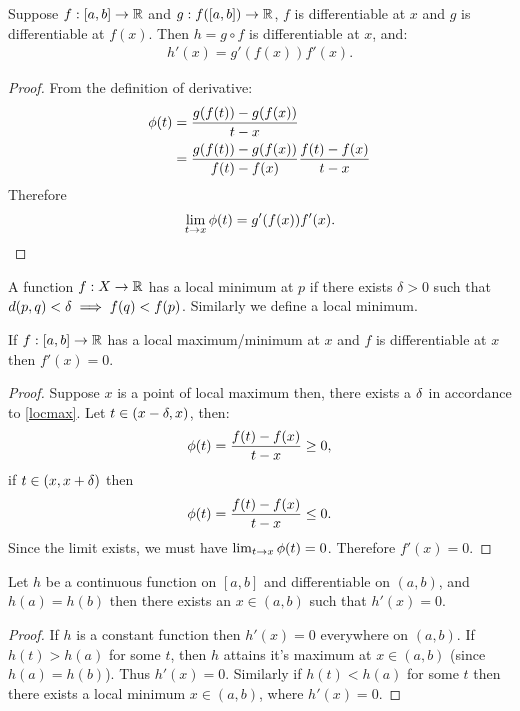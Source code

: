 \begin{proposition}
  Suppose $f:[a,b]\to \mathbb{R}$ and $g:f([a,b])\to \mathbb{R}$, $f$ is differentiable at $x$ and $g$ is differentiable at $f(x)$. Then $h = g\circ f$ is differentiable at $x$, and:
  \begin{align*}
    h'(x) = g'(f(x))f'(x).
  \end{align*}
\end{proposition}
\begin{proof}
  From the definition of derivative:
  \begin{align*}
    \phi(t) &= \frac{g(f(t)) - g(f(x))}{t-x}\\
          &= \frac{g(f(t)) - g(f(x))}{f(t)-f(x)}\frac{f(t)-f(x)}{t-x}\\
  \end{align*}
  Therefore
  \begin{align*}
    \lim_{t\to x} \phi(t) = g'(f(x)) f'(x).
  \end{align*}
\end{proof}
\begin{definition}\label{def:locmax}
  A function $f:X\to \mathbb{R}$ has a local minimum at $p$ if there exists $\delta > 0$ such that $d(p,q) <\delta \implies f(q) < f(p)$. Similarly we define a local minimum.
\end{definition}
\begin{proposition}
  If $f:[a,b] \to \mathbb{R}$ has a local maximum/minimum at $x$ and $f$ is differentiable at $x$ then $f'(x) = 0$.
\end{proposition}
\begin{proof}
  Suppose $x$ is a point of local maximum then, there exists a $\delta$ in accordance to \cref{locmax}. Let $t\in (x-\delta, x)$, then:
  \begin{align*}
    \phi(t) = \frac{f(t)-f(x)}{t-x} \geq 0,
  \end{align*}
  if $t\in (x, x+\delta)$ then
  \begin{align*}
    \phi(t) = \frac{f(t)-f(x)}{t-x} \leq 0.
  \end{align*}
  Since the limit exists, we must have $\lim_{t\to x}\phi(t) = 0$. Therefore $f'(x) = 0$.
\end{proof}
\begin{proposition}
  Let $h$ be a continuous function on $[a,b]$ and differentiable on $(a,b)$, and $h(a) = h(b)$ then there exists an $x\in (a,b)$ such that $h'(x) = 0$. 
\end{proposition}
\begin{proof}
  If $h$ is a constant function then $h'(x) = 0$ everywhere on $(a,b)$. If $h(t)>h(a)$ for some $t$, then $h$ attains it's maximum at $x\in (a,b)$ (since $h(a) = h(b)$). Thus $h'(x) = 0$. Similarly if $h(t)<h(a)$ for some $t$ then there exists a local minimum $x\in (a,b)$, where $h'(x) = 0$.
\end{proof}
